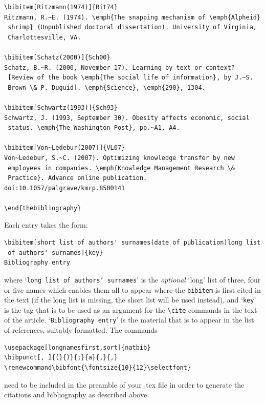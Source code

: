 \documentclass[]{interact}
\renewcommand\bibfont{\fontsize{10}{12}\selectfont}%
\theoremstyle{plain}%
\theoremstyle{definition}
\theoremstyle{remark}
\begin{document}
\begin{verbatim}
\bibitem[Ritzmann(1974)]{Rit74}
Ritzmann, R.~E. (1974). \emph{The snapping mechanism of \emph{Alpheid}
 shrimp} (Unpublished doctoral dissertation). University of Virginia,
 Charlottesville, VA.

\bibitem[Schatz(2000)]{Sch00}
Schatz, B.~R. (2000, November 17). Learning by text or context?
 [Review of the book \emph{The social life of information}, by J.~S.
 Brown \& P. Duguid]. \emph{Science}, \emph{290}, 1304.

\bibitem[Schwartz(1993)]{Sch93}
Schwartz, J. (1993, September 30). Obesity affects economic, social
 status. \emph{The Washington Post}, pp.~A1, A4.

\bibitem[Von~Ledebur(2007)]{VL07}
Von~Ledebur, S.~C. (2007). Optimizing knowledge transfer by new
 employees in companies. \emph{Knowledge Management Research \&
 Practice}. Advance online publication. doi:10.1057/palgrave/kmrp.8500141

\end{thebibliography}
\end{verbatim}
\bigskip
\noindent Each entry takes the form:
\begin{verbatim}
\bibitem[short list of authors' surnames(date of publication)long list
 of authors' surnames]{key}
Bibliography entry
\end{verbatim}
where `\texttt{long list of authors' surnames}' is the \emph{optional} `long' list of three, four or five names which enables them all to appear where the \verb"bibitem" is first cited in the text (if the long list is missing, the short list will be used instead), and `\texttt{key}' is the tag that is to be used as an argument for the \verb"\cite" commands in the text of the article. `\texttt{Bibliography entry}' is the material that is to appear in the list of references, suitably formatted. The commands
\begin{verbatim}
\usepackage[longnamesfirst,sort]{natbib}
\bibpunct[, ]{(}{)}{;}{a}{,}{,}
\renewcommand\bibfont{\fontsize{10}{12}\selectfont}
\end{verbatim}
need to be included in the preamble of your .tex file in order to generate the citations and bibliography as described above.
\end{document}
